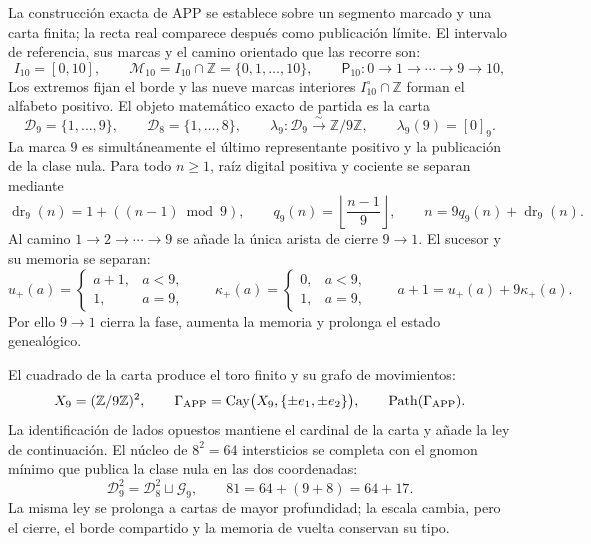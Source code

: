 La construcción exacta de APP se establece sobre un segmento marcado y una
carta finita; la recta real comparece después como publicación límite. El
intervalo de referencia, sus marcas y el camino orientado que las recorre son:
\begin{equation}
I_{10}=[0,10],\qquad
\mathcal M_{10}=I_{10}\cap\mathbb Z=\{0,1,\ldots,10\},
\qquad
\mathsf P_{10}:0\longrightarrow1\longrightarrow\cdots
\longrightarrow9\longrightarrow10,
\label{p12-83-c3-s1:eq:app-marked-segment}
\end{equation}
Los extremos fijan el borde y las nueve marcas interiores
\(I_{10}^{\circ}\cap\mathbb Z\) forman el alfabeto positivo. El objeto
matemático exacto de partida es la carta
\begin{equation}
\mathcal D_9=\{1,\ldots,9\},
\qquad \mathcal D_8=\{1,\ldots,8\},
\qquad
\lambda_9:\mathcal D_9\xrightarrow{\sim}\mathbb Z/9\mathbb Z,
\qquad \lambda_9(9)=[0]_9.
\label{p12-83-c3-s1:eq:app-positive-chart}
\end{equation}
La marca \(9\) es simultáneamente el último representante positivo y la
publicación de la clase nula. Para todo \(n\geq1\), raíz digital positiva y
cociente se separan mediante
\begin{equation}
\operatorname{dr}_9(n)=1+((n-1)\bmod9),
\qquad q_9(n)=\left\lfloor\frac{n-1}{9}\right\rfloor,
\qquad n=9q_9(n)+\operatorname{dr}_9(n).
\label{p12-83-c3-s1:eq:positive-digital-root-carry}
\end{equation}
Al camino \(1\to2\to\cdots\to9\) se añade la
única arista de cierre \(9\to1\). El sucesor y su memoria se separan:
\begin{equation}
u_+(a)=\begin{cases}a+1,&a<9,\\1,&a=9,\end{cases}
\qquad
\kappa_+(a)=\begin{cases}0,&a<9,\\1,&a=9,\end{cases}
\qquad a+1=u_+(a)+9\kappa_+(a).
\label{p12-83-c3-s1:eq:app-successor-carry}
\end{equation}
Por ello \(9\to1\) cierra la fase, aumenta la memoria y prolonga el estado
genealógico.

El cuadrado de la carta produce el toro finito y su grafo de movimientos:
\begin{equation}
X_9=(\mathbb Z/9\mathbb Z)^2,
\qquad
\Gamma_{\rm APP}=\operatorname{Cay}
\bigl(X_9,\{\pm e_1,\pm e_2\}\bigr),
\qquad
\operatorname{Path}(\Gamma_{\rm APP}).
\label{p12-83-c3-s1:eq:app-cayley-torus}
\end{equation}
La identificación de lados opuestos mantiene el cardinal de la carta y añade
la ley de continuación. El núcleo de \(8^2=64\) intersticios se completa con el gnomon
mínimo que publica la clase nula en las dos coordenadas:
\begin{equation}
\mathcal D_9^2=\mathcal D_8^2\sqcup\mathcal G_9,
\qquad
81=64+(9+8)=64+17.
\label{p12-83-c3-s1:eq:app-gnomon-public}
\end{equation}
La misma ley se prolonga a cartas de mayor profundidad; la escala cambia,
pero el cierre, el borde compartido y la memoria de vuelta conservan su tipo.

